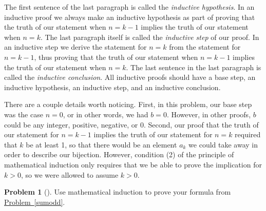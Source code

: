 \documentclass[10pt,]{book}
\theoremstyle{plain}
\theoremstyle{definition}
\newtheorem{activity}[project]{Problem}
\theoremstyle{definition}
\numberwithin{equation}{chapter}
\begin{document}
The first sentence of the last paragraph is called the \emph{inductive hypothesis}. In an inductive proof we always make an inductive hypothesis as part of proving that the truth of our statement when \(n=k-1\) implies the truth of our statement when \(n=k\). The last paragraph itself is called the \emph{inductive step} of our proof. In an inductive step we derive the statement for \(n=k\) from the statement for \(n=k-1\), thus proving that the truth of our statement when \(n=k-1\) implies the truth of our statement when \(n=k\). The last sentence in the last paragraph is called the \emph{inductive conclusion}. All inductive proofs should have a base step, an inductive hypothesis, an inductive step, and an inductive conclusion.%
\par
There are a couple details worth noticing. First, in this problem, our base step was the case \(n=0\), or in other words, we had \(b=0\). However, in other proofs, \(b\) could be any integer, positive, negative, or 0. Second, our proof that the truth of our statement for \(n=k-1\) implies the truth of our statement for \(n=k\) required that \(k\) be at least 1, so that there would be an element \(a_k\) we could take away in order to describe our bijection. However, condition (2) of the principle of mathematical induction only requires that we be able to prove the implication for \(k>0\), so we were allowed to assume \(k>0\).%
\begin{activity}[]\label{activity-362}
Use mathematical induction to prove your formula from \hyperref[sumodd]{Problem~\ref{sumodd}}.%
\end{activity}
\typeout{************************************************}
\typeout{************************************************}
\end{document}
